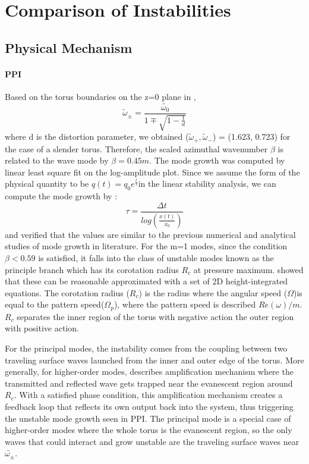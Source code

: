 \documentclass[iop,revtex4]{emulateapj}
\begin{document}
\section{Comparison of Instabilities}
\subsection{Physical Mechanism}
\paragraph*{\rm{\textbf{\acf{PPI}}\\}}
\par Based on the torus boundaries on the z=0 plane in \citep{Papaloizou:1984A},
\begin{equation}
\tilde{\omega}_\pm  = \frac{\tilde{\omega_0}}{1\mp\sqrt{1-\frac{1}{d}}}
\label{boundary}
\end{equation}
where d is the distortion parameter, we obtained ($\tilde{\omega}_+,\tilde{\omega}_-$) = (1.623, 0.723) for the case of a slender torus. Therefore, the scaled azimuthal wavenumber $\beta$ is related to the wave mode by $\beta = 0.45 m $. The mode growth was computed by linear least square fit on the log-amplitude plot. Since we assume the form of the physical quantity to be $q(t)=q_0 e^{\frac{t}{\tau}}$in the linear stability analysis, we can compute the mode growth by : 
\begin{equation}
\tau = \frac{\Delta t}{log(\frac{x(t)}{x_0})}
\end{equation}
and verified that the values are similar to the previous numerical and analytical studies of mode growth in literature. For the m=1 modes, since the condition $\beta<0.59$ is satisfied, it falls into the class of unstable modes known as the principle branch which has its corotation radius $R_c$ at pressure maximum. \cite{Goldreich:1986A} showed that these can be reasonable approximated with a set of 2D height-integrated equations. The corotation radius ($R_c$) is the radius where the angular speed ($\Omega$)is equal to the pattern speed($\Omega_p$), where the pattern speed is described $Re(\omega)/m$. $R_c$ separates the inner region of the torus with negative action the outer region with positive action.
\par For the principal modes, the instability comes from the coupling between two traveling surface waves launched from the inner and outer edge of the torus. More generally, for higher-order modes, \cite{Narayan:1987A} describes amplification mechanism where the transmitted and reflected wave gets trapped near the evanescent region around $R_c$. With a satisfied phase condition, this amplification mechanism creates a feedback loop that reflects its own output back into the system, thus triggering the unstable mode growth seen in \ac{PPI}. The principal mode is a special case of higher-order modes where the whole torus is the evanescent region, so the only waves that could interact and grow unstable are the traveling surface waves near $\tilde{\omega_\pm}$.
\end{document}
